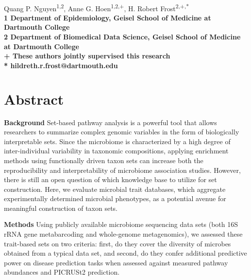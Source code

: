 \documentclass[10pt,letterpaper]{article}
\begin{document}
\vspace*{0.35in}

\begin{flushleft}
{\Large
\textbf{}
}
\newline
\\
Quang P. Nguyen\textsuperscript{1,2},
Anne G. Hoen\textsuperscript{1,2,+},
H. Robert Frost\textsuperscript{2,+,*}
\\
\bigskip
\bf{1} Department of Epidemiology, Geisel School of Medicine at Dartmouth College
\\
\bf{2} Department of Biomedical Data Science, Geisel School of Medicine at Dartmouth College
\\
\bigskip
+ These authors jointly supervised this research \\

* hildreth.r.frost@dartmouth.edu

\end{flushleft}

\section*{Abstract}
\textbf{Background} Set-based pathway analysis is a powerful tool that allows researchers to summarize complex genomic variables in the form of biologically interpretable sets. Since the microbiome is characterized by a high degree of inter-individual variability in taxonomic compositions, applying enrichment methods using functionally driven taxon sets can increase both the reproducibility and interpretability of microbiome association studies. However, there is still an open question of which knowledge base to utilize for set construction. Here, we evaluate microbial trait databases, which aggregate experimentally determined microbial phenotypes, as a potential avenue for meaningful construction of taxon sets.  

\noindent\textbf{Methods} Using publicly available microbiome sequencing data sets (both 16S rRNA gene metabarcoding and whole-genome metagenomics), we assessed these trait-based sets on two criteria: first, do they cover the diversity of microbes obtained from a typical data set, and second, do they confer additional predictive power on disease prediction tasks when assessed against measured pathway abundances and PICRUSt2 prediction.   
\end{document}
